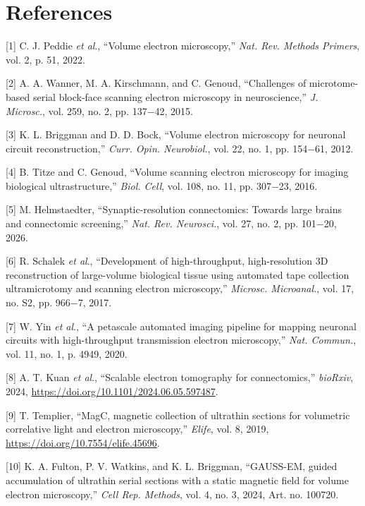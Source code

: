 \documentclass{article}
\begin{document}
\section*{References}

\begin{hangpars}
\small
{}[1] C. J. Peddie \emph{et al}., “Volume electron microscopy,” \emph{Nat. Rev. Methods Primers}, vol. 2, p. 51, 2022.

[2] A. A. Wanner, M. A. Kirschmann, and C. Genoud, “Challenges of microtome-based serial block-face scanning electron microscopy in neuroscience,” \emph{J. Microsc.}, vol. 259, no. 2, pp. 137−42, 2015.

[3] K. L. Briggman and D. D. Bock, “Volume electron microscopy for neuronal circuit reconstruction,” \emph{Curr. Opin. Neurobiol.}, vol. 22, no. 1, pp. 154−61, 2012.

[4] B. Titze and C. Genoud, “Volume scanning electron microscopy for imaging biological ultrastructure,” \emph{Biol. Cell}, vol. 108, no. 11, pp. 307−23, 2016.

[5] M. Helmstaedter, “Synaptic-resolution connectomics: Towards large brains and connectomic screening,” \emph{Nat. Rev. Neurosci.}, vol. 27, no. 2, pp. 101−20, 2026.

[6] R. Schalek \emph{et al}., “Development of high-throughput, high-resolution 3D reconstruction of large-volume biological tissue using automated tape collection ultramicrotomy and scanning electron microscopy,” \emph{Microsc. Microanal.}, vol. 17, no. S2, pp. 966−7, 2017.

[7] W. Yin \emph{et al}., “A petascale automated imaging pipeline for mapping neuronal circuits with high-throughput transmission electron microscopy,” \emph{Nat. Commun.}, vol. 11, no. 1, p. 4949, 2020.

[8] A. T. Kuan \emph{et al}., “Scalable electron tomography for connectomics,” \emph{bioRxiv}, 2024, \url{https://doi.org/10.1101/2024.06.05.597487}.

[9] T. Templier, “MagC, magnetic collection of ultrathin sections for volumetric correlative light and electron microscopy,” \emph{Elife}, vol. 8, 2019, \url{https://doi.org/10.7554/elife.45696}.

[10] K. A. Fulton, P. V. Watkins, and K. L. Briggman, “GAUSS-EM, guided accumulation of ultrathin serial sections with a static magnetic field for volume electron microscopy,” \emph{Cell Rep. Methods}, vol. 4, no. 3, 2024, Art. no. 100720.


\end{hangpars}
\end{document}
